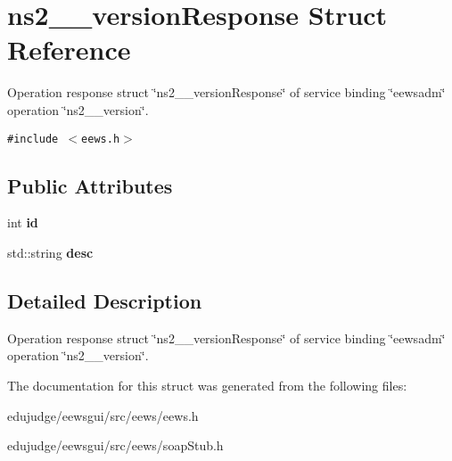 \section{ns2\_\-\_\-versionResponse Struct Reference}
\label{structns2____versionResponse}
Operation response struct \char`\"{}ns2\_\-\_\-versionResponse\char`\"{} of service binding \char`\"{}eewsadm\char`\"{} operation \char`\"{}ns2\_\-\_\-version\char`\"{}.  


{\tt \#include $<$eews.h$>$}

\subsection*{Public Attributes}
\begin{CompactItemize}
\item 
int \textbf{id}\label{structns2____versionResponse_2c4ce12b51a02907702359cc64a79c1e}

\item 
std::string \textbf{desc}\label{structns2____versionResponse_cc83969be4e7f64a5cf32321b246714d}

\end{CompactItemize}


\subsection{Detailed Description}
Operation response struct \char`\"{}ns2\_\-\_\-versionResponse\char`\"{} of service binding \char`\"{}eewsadm\char`\"{} operation \char`\"{}ns2\_\-\_\-version\char`\"{}. 

The documentation for this struct was generated from the following files:\begin{CompactItemize}
\item 
edujudge/eewsgui/src/eews/eews.h\item 
edujudge/eewsgui/src/eews/soapStub.h\end{CompactItemize}
